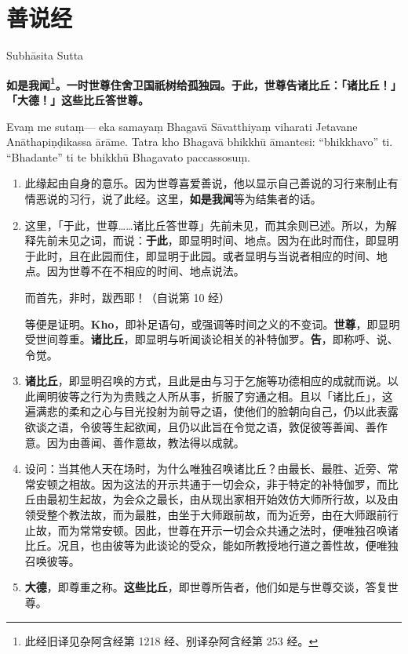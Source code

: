 \section{善说经}

\begin{center}Subhāsita Sutta\end{center}\vspace{1em}

\textbf{如是我闻\footnote{此经旧译见杂阿含经第 1218 经、别译杂阿含经第 253 经。}。一时世尊住舍卫国祇树给孤独园。于此，世尊告诸比丘：「诸比丘！」「大德！」这些比丘答世尊。}

Evaṃ me sutaṃ— eka samayaṃ Bhagavā Sāvatthiyaṃ viharati Jetavane Anāthapiṇḍikassa ārāme. Tatra kho Bhagavā bhikkhū āmantesi: “bhikkhavo” ti. “Bhadante” ti te bhikkhū Bhagavato paccassosuṃ.

\begin{enumerate}\item 此缘起由自身的意乐。因为世尊喜爱善说，他以显示自己善说的习行来制止有情恶说的习行，说了此经。这里，\textbf{如是我闻}等为结集者的话。
\item 这里，「于此，世尊……诸比丘答世尊」先前未见，而其余则已述。所以，为解释先前未见之词，而说：\textbf{于此}，即显明时间、地点。因为在此时而住，即显明于此时，且在此园而住，即显明于此园。或者显明与当说者相应的时间、地点。因为世尊不在不相应的时间、地点说法。\begin{quoting}而首先，非时，跋西耶！（自说第 10 经）\end{quoting}等便是证明。\textbf{Kho}，即补足语句，或强调等时间之义的不变词。\textbf{世尊}，即显明受世间尊重。\textbf{诸比丘}，即显明与听闻谈论相关的补特伽罗。\textbf{告}，即称呼、说、令觉。
\item \textbf{诸比丘}，即显明召唤的方式，且此是由与习于乞施等功德相应的成就而说。以此阐明彼等之行为为贵贱之人所从事，折服了穷通之相。且以「诸比丘」，这遍满悲的柔和之心与目光投射为前导之语，使他们的脸朝向自己，仍以此表露欲谈之语，令彼等生起欲闻，且仍以此旨在令觉之语，敦促彼等善闻、善作意。因为由善闻、善作意故，教法得以成就。
\item 设问：当其他人天在场时，为什么唯独召唤诸比丘？由最长、最胜、近旁、常常安顿之相故。因为这法的开示共通于一切会众，非于特定的补特伽罗，而比丘由最初生起故，为会众之最长，由从现出家相开始效仿大师所行故，以及由领受整个教法故，而为最胜，由坐于大师跟前故，而为近旁，由在大师跟前行止故，而为常常安顿。因此，世尊在开示一切会众共通之法时，便唯独召唤诸比丘。况且，也由彼等为此谈论的受众，能如所教授地行道之善性故，便唯独召唤彼等。
\item \textbf{大德}，即尊重之称。\textbf{这些比丘}，即世尊所告者，他们如是与世尊交谈，答复世尊。\end{enumerate}


